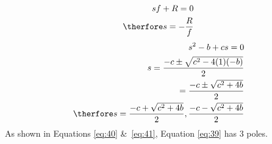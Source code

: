 \begin{align}
    sf+R = 0 \nonumber \\
    \therfore s = -\frac{R}{f} \label{eq:40}
\end{align}
\begin{align}
    s^2 - b + cs = 0 \nonumber \\
    s = \frac{-c \pm \sqrt{c^2 - 4(1)(-b)}}{2} \nonumber \\
    = \frac{-c \pm \sqrt{c^2 + 4b}}{2} \nonumber \\
    \therfore s = \frac{-c + \sqrt{c^2 + 4b}}{2} ,\frac{-c - \sqrt{c^2 + 4b}}{2} \label{eq:41}   
\end{align}
As shown in Equations \eqref{eq:40} \&\ \eqref{eq:41}, Equation \eqref{eq:39} has 3 poles.
\pagebreak